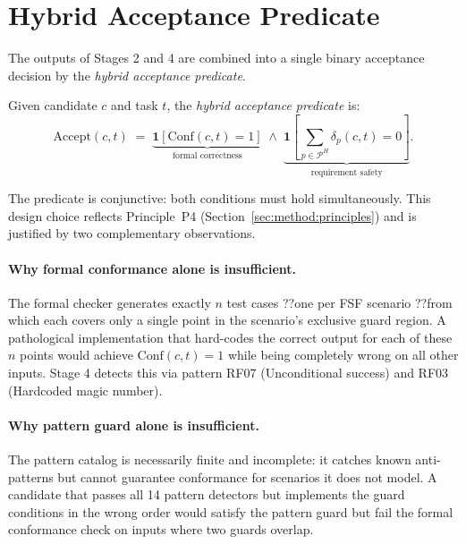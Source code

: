 \section{Hybrid Acceptance Predicate}
\label{sec:method:accept}

The outputs of Stages 2 and 4 are combined into a single binary acceptance
decision by the \emph{hybrid acceptance predicate}.

\begin{definition}
\label{def:accept}
Given candidate $c$ and task $t$, the \emph{hybrid acceptance predicate} is:
\begin{equation}
  \mathrm{Accept}(c, t) \;=\;
    \underbrace{\mathbf{1}\!\left[\mathrm{Conf}(c, t) = 1\right]}_{\text{formal correctness}}
    \;\land\;
    \underbrace{\mathbf{1}\!\left[\sum_{p \in \mathcal{P}^H}
      \delta_p(c, t) = 0\right]}_{\text{requirement safety}}.
  \label{eq:accept}
\end{equation}
\end{definition}

The predicate is conjunctive: both conditions must hold simultaneously.
This design choice reflects Principle~P4 (Section~\ref{sec:method:principles})
and is justified by two complementary observations.

\paragraph{Why formal conformance alone is insufficient.}
The formal checker generates exactly $n$ test cases ??one per FSF scenario ??from which each covers only a single point in the scenario's exclusive guard
region.  A pathological implementation that hard-codes the correct output for
each of these $n$ points would achieve $\mathrm{Conf}(c,t) = 1$ while being
completely wrong on all other inputs.  Stage 4 detects this via pattern RF07
(Unconditional success) and RF03 (Hardcoded magic number).

\paragraph{Why pattern guard alone is insufficient.}
The pattern catalog is necessarily finite and incomplete: it catches known
anti-patterns but cannot guarantee conformance for scenarios it does not
model.  A candidate that passes all 14 pattern detectors but implements the
guard conditions in the wrong order would satisfy the pattern guard but fail
the formal conformance check on inputs where two guards overlap.

